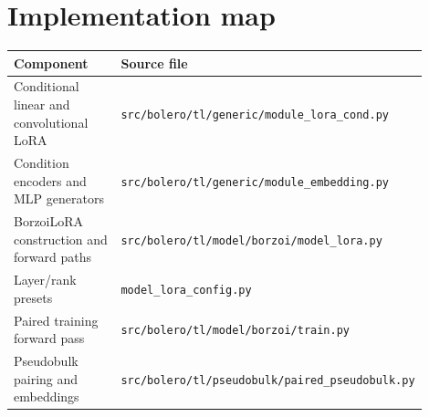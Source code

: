 \documentclass[11pt]{article}
\newcommand{\code}[1]{\texttt{\small #1}}
\begin{document}
\section{Implementation map}

\begin{center}
\begin{tabular}{p{0.38\linewidth}p{0.52\linewidth}}
\toprule
Component & Source file \\
\midrule
Conditional linear and convolutional LoRA & {\scriptsize\code{src/bolero/tl/generic/module\_lora\_cond.py}} \\
Condition encoders and MLP generators & {\scriptsize\code{src/bolero/tl/generic/module\_embedding.py}} \\
BorzoiLoRA construction and forward paths & {\scriptsize\code{src/bolero/tl/model/borzoi/model\_lora.py}} \\
Layer/rank presets & {\scriptsize\texttt{model\_lora\_config.py}} \\
Paired training forward pass & {\scriptsize\code{src/bolero/tl/model/borzoi/train.py}} \\
Pseudobulk pairing and embeddings & {\scriptsize\code{src/bolero/tl/pseudobulk/paired\_pseudobulk.py}} \\
\bottomrule
\end{tabular}
\end{center}
\end{document}

